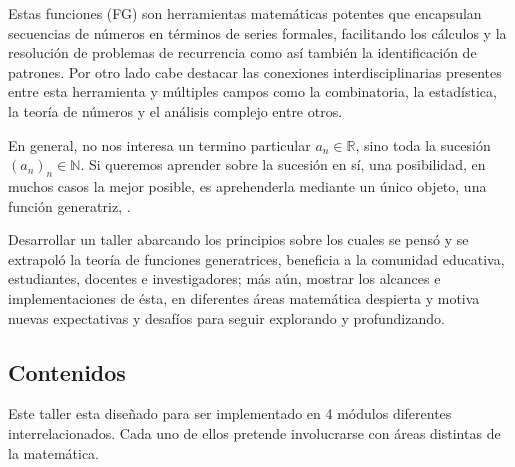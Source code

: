 Estas funciones (FG) son herramientas matemáticas potentes que encapsulan secuencias de números en términos de series formales, facilitando los cálculos y la resolución de problemas de recurrencia como así también la identificación de patrones. Por otro lado cabe destacar las conexiones interdisciplinarias presentes entre esta herramienta y múltiples campos como la combinatoria, la estadística, la teoría de números y el análisis complejo entre otros.

En general, no nos interesa un termino particular $a_n \in \mathbb{R}$, sino toda la sucesión $(a_n)_n \in \mathbb{N}$. Si queremos aprender sobre la sucesión en sí, una posibilidad, en muchos casos la mejor posible, es aprehenderla mediante un único objeto, una función generatriz, \textcite{wilf1994}.

Desarrollar un taller abarcando los principios sobre los cuales se pensó y se extrapoló la teoría de funciones generatrices, beneficia a la comunidad educativa, estudiantes, docentes e investigadores; más aún, mostrar los alcances e implementaciones de ésta, en diferentes áreas matemática despierta y motiva nuevas expectativas y desafíos para seguir explorando y profundizando.

\subsection{Contenidos}

Este taller esta diseñado para ser implementado en 4 módulos diferentes interrelacionados. Cada uno de ellos pretende involucrarse con áreas distintas de la matemática.

